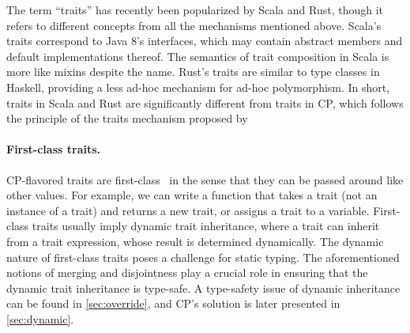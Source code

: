 The term ``traits'' has recently been popularized by Scala and Rust, though it
refers to different concepts from all the mechanisms mentioned above. Scala's
traits correspond to Java 8's interfaces, which may contain abstract members and
default implementations thereof. The semantics of trait composition in Scala is
more like mixins despite the name. Rust's traits are similar to type classes in
Haskell, providing a less ad-hoc mechanism for ad-hoc polymorphism. In short,
traits in Scala and Rust are significantly different from traits in CP, which
follows the principle of the traits mechanism proposed by
\citeauthor{ducasse2006traits}

\paragraph{First-class traits.}
CP-flavored traits are first-class~\citep{bi2018typed} in the sense that they
can be passed around like other values. For example, we can write a function
that takes a trait (not an instance of a trait) and returns a new trait, or
assigns a trait to a variable. First-class traits usually imply dynamic trait
inheritance, where a trait can inherit from a trait expression, whose result is
determined dynamically. The dynamic nature of first-class traits poses a
challenge for static typing. The aforementioned notions of merging and
disjointness play a crucial role in ensuring that the dynamic trait inheritance
is type-safe. A type-safety issue of dynamic inheritance can be found in
\autoref{sec:override}, and CP's solution is later presented in
\autoref{sec:dynamic}.
